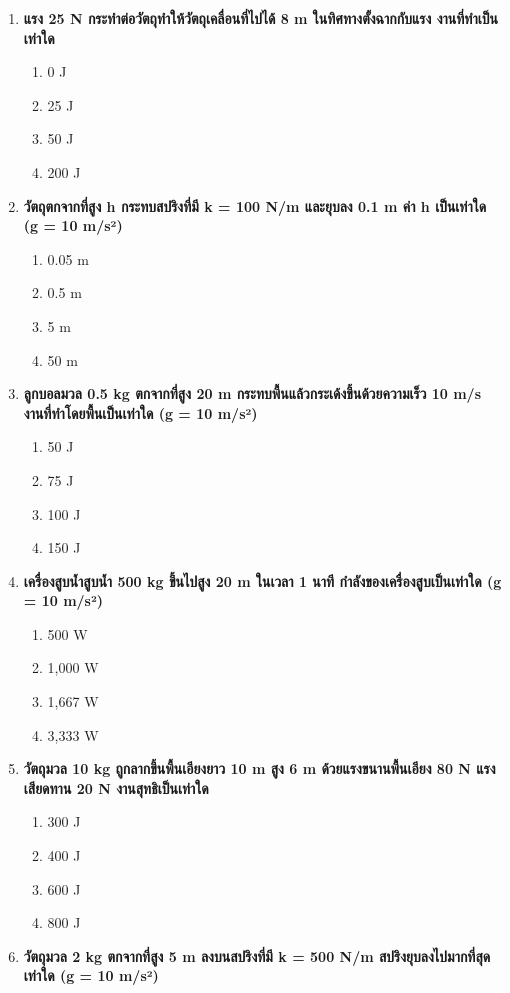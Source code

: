 \documentclass[12pt]{article}
\begin{document}
\begin{enumerate}
\item \textbf{แรง 25 N กระทำต่อวัตถุทำให้วัตถุเคลื่อนที่ไปได้ 8 m ในทิศทางตั้งฉากกับแรง งานที่ทำเป็นเท่าใด}
\begin{enumerate}[label=\alph*)]
\item 0 J
\item 25 J
\item 50 J
\item 200 J
\end{enumerate}
\item \textbf{วัตถุตกจากที่สูง h กระทบสปริงที่มี k = 100 N/m และยุบลง 0.1 m ค่า h เป็นเท่าใด (g = 10 m/s²)}
\begin{enumerate}[label=\alph*)]
\item 0.05 m
\item 0.5 m
\item 5 m
\item 50 m
\end{enumerate}
\item \textbf{ลูกบอลมวล 0.5 kg ตกจากที่สูง 20 m กระทบพื้นแล้วกระเด้งขึ้นด้วยความเร็ว 10 m/s งานที่ทำโดยพื้นเป็นเท่าใด (g = 10 m/s²)}
\begin{enumerate}[label=\alph*)]
\item 50 J
\item 75 J
\item 100 J
\item 150 J
\end{enumerate}
\item \textbf{เครื่องสูบน้ำสูบน้ำ 500 kg ขึ้นไปสูง 20 m ในเวลา 1 นาที กำลังของเครื่องสูบเป็นเท่าใด (g = 10 m/s²)}
\begin{enumerate}[label=\alph*)]
\item 500 W
\item 1,000 W
\item 1,667 W
\item 3,333 W
\end{enumerate}
\item \textbf{วัตถุมวล 10 kg ถูกลากขึ้นพื้นเอียงยาว 10 m สูง 6 m ด้วยแรงขนานพื้นเอียง 80 N แรงเสียดทาน 20 N งานสุทธิเป็นเท่าใด}
\begin{enumerate}[label=\alph*)]
\item 300 J
\item 400 J
\item 600 J
\item 800 J
\end{enumerate}
\item \textbf{วัตถุมวล 2 kg ตกจากที่สูง 5 m ลงบนสปริงที่มี k = 500 N/m สปริงยุบลงไปมากที่สุดเท่าใด (g = 10 m/s²)}

\end{enumerate}
\end{document}
